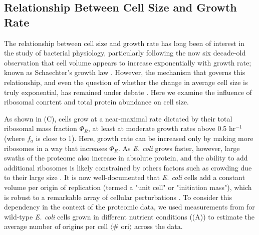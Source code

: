 
\subsection{Relationship Between Cell Size and Growth Rate}
The relationship between cell size and growth rate has long been of interest in
the study of bacterial physiology, particularly following the now six decade-old
observation that cell volume appears to increase exponentially with growth rate;
known as Schaechter's growth law \citep{schaechter1958, taheriaraghi2015}.
However, the mechanism that governs this relationship, and even the question of
whether the change in average cell size is truly exponential, has remained under
debate \citep{harris2018}.  Here we examine the influence of ribosomal conrtent
and total protein abundance on cell size.

As shown in (C), cells grow at a near-maximal rate dictated
by their total ribosomal mass fraction $\Phi_R$, at least at moderate growth
rates above 0.5 hr$^{-1}$ (where $f_a$ is close to 1). Here,  growth rate can be
increased only by making more ribosomes in a way that increases  $\Phi_R$. As
\textit{E. coli} grows faster, however, large swaths of the proteome also
increase in absolute protein, and the ability to add additional ribosomes is
likely constrained by others factors such as  crowding due to their large size
\citep{delarue2018, solerbistue2020}. It is now well-documented that
\textit{E. coli} cells add a constant volume per origin of replication (termed a
"unit cell" or "initiation mass"), which is robust to a remarkable array of
cellular perturbations \citep{si2017}. To consider this dependency in the context of the
proteomic data, we used measurements from \cite{si2017} for wild-type
\textit{E. coli} cells grown in different nutrient conditions
((A)) to estimate the average number of origins per
cell $\langle$\# ori$\rangle$ across the data.

